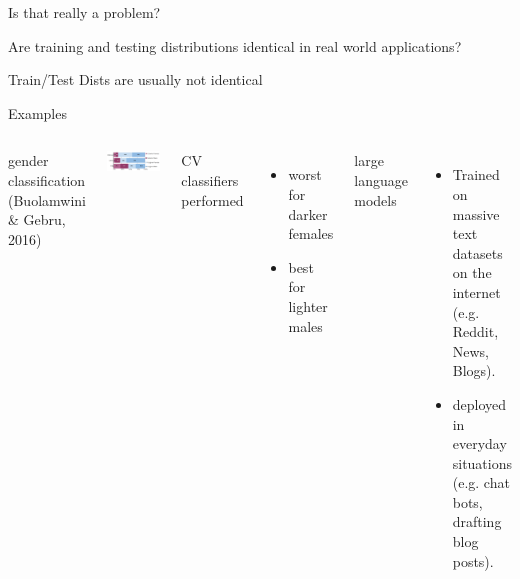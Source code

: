 \documentclass[11pt]{beamer}
\begin{document}
	\begin{frame}[plain]
		\centering
		\hfill
			\Large
			
			Is that really a problem?
			
			\vspace{1em}
			Are training and testing distributions identical in real world applications?
			
		\hfill
	\end{frame}

	\begin{frame}{Train/Test Dists are usually not identical}
		
		Examples
		\begin{columns}[t]
				
				gender classification \\
				{\scriptsize (Buolamwini \& Gebru, 2016)}
				
				\vspace{1em}
				
				\includegraphics[width=\textwidth]{images/BoulamwiniGebru2016}
				
				\vspace{1em}
				
				CV classifiers performed
				\begin{itemize}
					\item worst for darker females
					\item best for lighter males
				\end{itemize}
			
			
				large language models
				
				\begin{itemize}
					\item Trained on massive text datasets on the internet (e.g. Reddit, News, Blogs).
					\item deployed in everyday situations (e.g. chat bots,  drafting blog posts).
				\end{itemize}
			

\end{columns}
\end{frame}
\end{document}
